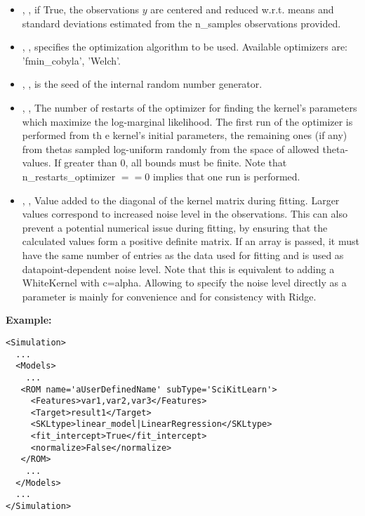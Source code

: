 \begin{itemize}
  \item {}, , if True, the
  observations $y$ are centered and reduced w.r.t. means and
  standard deviations estimated from the n\_samples observations provided.
  \item {}, , specifies the
  optimization algorithm to be used.
  Available optimizers are: 'fmin\_cobyla', 'Welch'.
  \item {}, , is the seed
  of the internal random number generator.
  \item {}, , The number of restarts of the optimizer for finding
the kernel’s parameters which maximize the log-marginal likelihood. The first run of the optimizer is performed from th
e kernel’s initial parameters, the remaining ones (if any) from thetas sampled log-uniform randomly from the space of
allowed theta-values. If greater than 0, all bounds must be finite. Note that n\_restarts\_optimizer $== 0$ implies that one run is performed.
  \item {}, , Value added to the diagonal of the kernel matrix during fitting.
 Larger values correspond to increased noise level in the observations. This can also prevent a potential numerical issue
 during fitting, by ensuring that the calculated values form a positive definite matrix. If an array is passed, it must have the
 same number of entries as the data used for fitting and is used as datapoint-dependent noise level. Note that this is
 equivalent to adding a WhiteKernel with c=alpha. Allowing to specify the noise level directly as a parameter is mainly for
 convenience and for consistency with Ridge.
\end{itemize}


\textbf{Example:}
\begin{lstlisting}[style=XML,morekeywords={name,subType}]
<Simulation>
  ...
  <Models>
    ...
   <ROM name='aUserDefinedName' subType='SciKitLearn'>
     <Features>var1,var2,var3</Features>
     <Target>result1</Target>
     <SKLtype>linear_model|LinearRegression</SKLtype>
     <fit_intercept>True</fit_intercept>
     <normalize>False</normalize>
   </ROM>
    ...
  </Models>
  ...
</Simulation>
\end{lstlisting}


